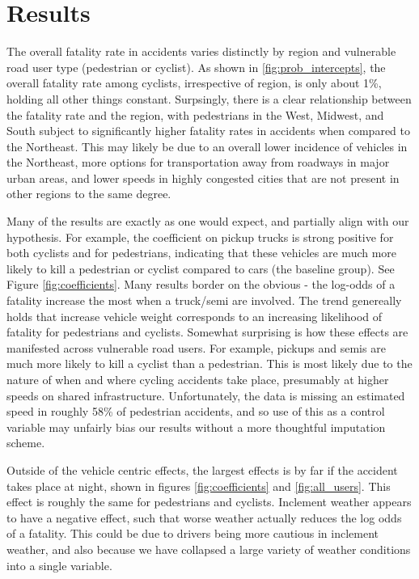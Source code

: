 \documentclass[12pt]{article}
\begin{document}
\section{Results}

The overall fatality rate in accidents varies distinctly by region and vulnerable road user
type (pedestrian or cyclist). As shown in \ref{fig:prob_intercepts}, the overall fatality rate
among cyclists, irrespective of region, is only about 1\%, holding all other things constant. Surpsingly,
there is a clear relationship between the fatality rate and the region, with pedestrians in the West, Midwest, and South
subject to significantly higher fatality rates in accidents when compared to the Northeast. This may likely
be due to an overall lower incidence of vehicles in the Northeast, more options for transportation away from roadways
in major urban areas, and lower speeds in highly congested cities that are not present in other regions to the
same degree.

Many of the results are exactly as one would expect, and partially align with our hypothesis. For example, the
coefficient on pickup trucks is strong positive for both cyclists and for pedestrians, indicating that these vehicles
are much more likely to kill a pedestrian or cyclist compared to cars (the baseline group). See
Figure \ref{fig:coefficients}. Many results border on the obvious - the log-odds of a fatality increase the most when
a truck/semi are involved. The trend genereally holds that increase vehicle weight corresponds to an increasing
likelihood of fatality for pedestrians and cyclists. Somewhat surprising is how these effects are manifested across
vulnerable road users. For example, pickups and semis are much more likely to kill a cyclist than a pedestrian. This is
most likely due to the nature of when and where cycling accidents take place, presumably at higher speeds on shared
infrastructure. Unfortunately, the data is missing an estimated speed in roughly 58\% of pedestrian accidents, and so
use of this as a control variable may unfairly bias our results without a more thoughtful imputation scheme.

Outside of the vehicle centric effects, the largest effects is by far if the accident takes place at night, shown in
figures \ref{fig:coefficients} and \ref{fig:all_users}. This effect is roughly the same for pedestrians and cyclists. 
Inclement weather appears to have a negative effect, such that
worse weather actually reduces the log odds of a fatality. This could be due to drivers being more cautious in
inclement weather, and also because we have collapsed a large variety of weather conditions into a single variable.
\end{document}
